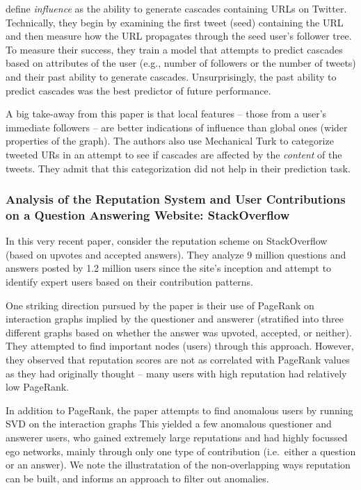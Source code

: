 \documentclass[10pt]{article}
\begin{document}
\citet{bakshy2011everyone} define \textit{influence} as the ability to generate
cascades containing URLs on Twitter. Technically, they begin by examining the
first tweet (seed) containing the URL and then measure how the URL propagates
through the seed user's follower tree. To measure their success, they train a
model that attempts to predict cascades based on attributes of the user (e.g.,
number of followers or the number of tweets) and their past ability to generate
cascades.  Unsurprisingly, the past ability to predict cascades was the best
predictor of future performance.

A big take-away from this paper is that local features -- those from a user's
immediate followers -- are better indications of influence than global ones
(wider properties of the graph). The authors also use Mechanical Turk to
categorize tweeted URs in an attempt to see if cascades are affected by the
\textit{content} of the tweets. They admit that this categorization did not help
in their prediction task. 

\subsubsection{Analysis of the Reputation System and User Contributions on a
  Question Answering Website: StackOverflow
  \citep{movshovitzanalysis}}

In this very recent paper, \citet{movshovitzanalysis} consider the reputation
scheme on StackOverflow (based on upvotes and accepted answers). They analyze 9
million questions and answers posted by 1.2 million users since the site's
inception and attempt to identify expert users based on their contribution
patterns.

One striking direction pursued by the paper is their use of PageRank on
interaction graphs implied by the questioner and answerer (stratified into three
different graphs based on whether the answer was upvoted, accepted, or neither).
They attempted to find important nodes (users) through this approach. However,
they observed that reputation scores are not as correlated with PageRank values
as they had originally thought -- many users with high reputation had
relatively low PageRank.

In addition to PageRank, the paper attempts to find anomalous users by running
SVD on the interaction graphs This yielded a few anomalous questioner and
answerer users, who gained extremely large reputations and had highly focussed
ego networks, mainly through only one type of contribution (i.e.\ either a
question or an answer). We note the illustratation of the non-overlapping ways
reputation can be built, and informs an approach to filter out anomalies.
\end{document}
